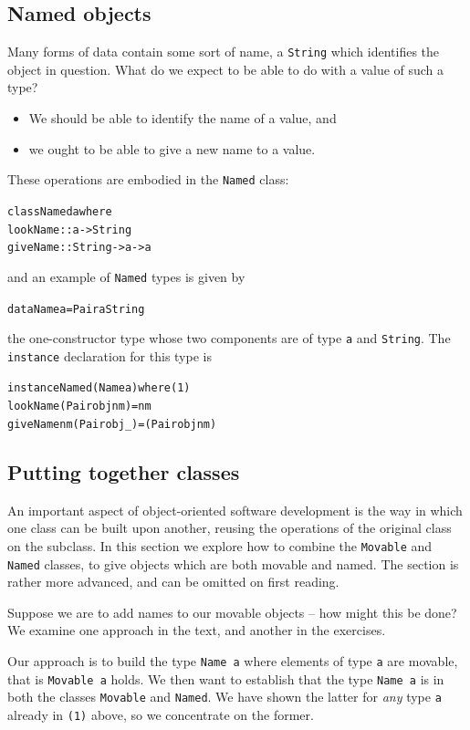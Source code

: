 \subsection*{Named objects}

Many forms of data contain some sort of name, a \texttt{String} which identifies
the object in question. What do we expect to be able to do with a value of
such a type?
\begin{itemize}
\item We should be able to identify the name of a value, and
\item we ought to be able to give a new name to a value.
\end{itemize}
These operations are embodied in the \texttt{Named} class:
\begin{alltt}
class Named a where
  lookName :: a -> String
  giveName :: String -> a -> a
\end{alltt}
and an example of \texttt{Named} types is given by
\begin{alltt}
data Name a = Pair a String
\end{alltt}
the one-constructor type whose two components are of type \texttt{a} and 
\texttt{String}. The \texttt{instance} declaration for this type is
\begin{alltt}
instance Named (Name a) where\hfill(1)
  lookName (Pair obj nm) = nm
  giveName nm (Pair obj _) = (Pair obj nm)
\end{alltt}

\subsection*{Putting together classes}

An important aspect of object-oriented software development is the way in
which one class can be built upon another, reusing the operations of the
original class on the subclass. In this section we explore how to combine the
\texttt{Movable} and \texttt{Named} classes, to give objects which are both movable
and named. The section is
rather more advanced, and
can be omitted on first reading.


Suppose we are to add names to our movable objects -- how might this be done?
We examine one approach in the text, and another in the exercises.

Our approach is to build the type \texttt{Name a} where elements of type \texttt{a}
are movable, that is \texttt{Movable a} holds. We then
want to establish that the type \texttt{Name a} is in both the classes 
\texttt{Movable} and \texttt{Named}. We have shown the latter for {\em any\/} type 
\texttt{a} already in \texttt{(1)} above, so we concentrate on the former.


